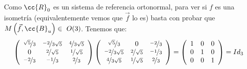 \begin{ejercicio}
\begin{enumerate}
        Como $\cc{R}_0$ es un sistema de referencia ortonormal, para ver si $f$ es una isometría (equivalentemente vemos que $\vec{f}$ lo es) basta con probar que $M\left(\vec{f}, \cc{B}_u\right)\in~O(3)$. Tenemos que:
        \begin{equation*}
            \left(
            \begin{array}{ccc}
                \nicefrac{\sqrt{5}}{3} & \nicefrac{-2}{3\sqrt{5}} & \nicefrac{4}{3\sqrt{5}} \\
                0 & \nicefrac{2}{\sqrt{5}} & \nicefrac{1}{\sqrt{5}} \\
                \nicefrac{-2}{3} & \nicefrac{-1}{3} & \nicefrac{2}{3} 
            \end{array}
            \right)
            \left(
            \begin{array}{ccc}
                \nicefrac{\sqrt{5}}{3} & 0 & \nicefrac{-2}{3} \\
                \nicefrac{-2}{3\sqrt{5}} & \nicefrac{2}{\sqrt{5}} & \nicefrac{-1}{3} \\
                \nicefrac{4}{3\sqrt{5}} & \nicefrac{1}{\sqrt{5}} & \nicefrac{2}{3}
            \end{array}
            \right)
            = 
            \left(
            \begin{array}{ccc}
                1 & 0 & 0\\
                0 & 1 & 0\\
                0 & 0 & 1
            \end{array}
            \right) = Id_3
        \end{equation*}


\end{enumerate}
\end{ejercicio}
